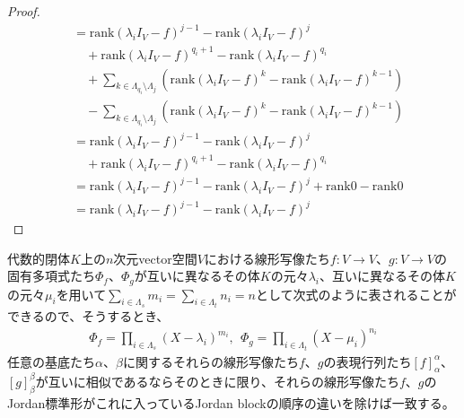 \documentclass[dvipdfmx]{jsarticle}
\begin{document}
\begin{proof}
\begin{align*}
&= {\mathrm{rank}}\left( \lambda_{i}I_{V} - f \right)^{j - 1} - {\mathrm{rank}}\left( \lambda_{i}I_{V} - f \right)^{j} \\
&\quad + {\mathrm{rank}}\left( \lambda_{i}I_{V} - f \right)^{q_{i} + 1} - {\mathrm{rank}}\left( \lambda_{i}I_{V} - f \right)^{q_{i}} \\
&\quad + \sum_{k \in \varLambda_{q_{i}} \setminus \varLambda_{j}} \left( {\mathrm{rank}}\left( \lambda_{i}I_{V} - f \right)^{k} - {\mathrm{rank}}\left( \lambda_{i}I_{V} - f \right)^{k - 1} \right) \\
&\quad - \sum_{k \in \varLambda_{q_{i}} \setminus \varLambda_{j}} \left( {\mathrm{rank}}\left( \lambda_{i}I_{V} - f \right)^{k} - {\mathrm{rank}}\left( \lambda_{i}I_{V} - f \right)^{k - 1} \right)\\
&= {\mathrm{rank}}\left( \lambda_{i}I_{V} - f \right)^{j - 1} - {\mathrm{rank}}\left( \lambda_{i}I_{V} - f \right)^{j} \\
&\quad + {\mathrm{rank}}\left( \lambda_{i}I_{V} - f \right)^{q_{i} + 1} - {\mathrm{rank}}\left( \lambda_{i}I_{V} - f \right)^{q_{i}}\\
&= {\mathrm{rank}}\left( \lambda_{i}I_{V} - f \right)^{j - 1} - {\mathrm{rank}}\left( \lambda_{i}I_{V} - f \right)^{j} + {\mathrm{rank}}0 - {\mathrm{rank}}0\\
&= {\mathrm{rank}}\left( \lambda_{i}I_{V} - f \right)^{j - 1} - {\mathrm{rank}}\left( \lambda_{i}I_{V} - f \right)^{j}
\end{align*}
\end{proof}
\begin{thm}\label{2.2.6.4}
代数的閉体$K$上の$n$次元vector空間$V$における線形写像たち$f:V \rightarrow V$、$g:V \rightarrow V$の固有多項式たち$\varPhi_{f}$、$\varPhi_{g}$が互いに異なるその体$K$の元々$\lambda_{i}$、互いに異なるその体$K$の元々$\mu_{i}$を用いて$\sum_{i \in \varLambda_{s}} m_{i} = \sum_{i \in \varLambda_{t}} n_{i} = n$として次式のように表されることができるので、そうするとき、
\begin{align*}
\varPhi_{f} = \prod_{i \in \varLambda_{s}} \left( X - \lambda_{i} \right)^{m_{i}},\ \ \varPhi_{g} = \prod_{i \in \varLambda_{t}} \left( X - \mu_{i} \right)^{n_{i}}
\end{align*}
任意の基底たち$\alpha$、$\beta$に関するそれらの線形写像たち$f$、$g$の表現行列たち$[ f]_{\alpha}^{\alpha}$、$[ g]_{\beta}^{\beta}$が互いに相似であるならそのときに限り、それらの線形写像たち$f$、$g$のJordan標準形がこれに入っているJordan blockの順序の違いを除けば一致する。
\end{thm}
\end{document}
